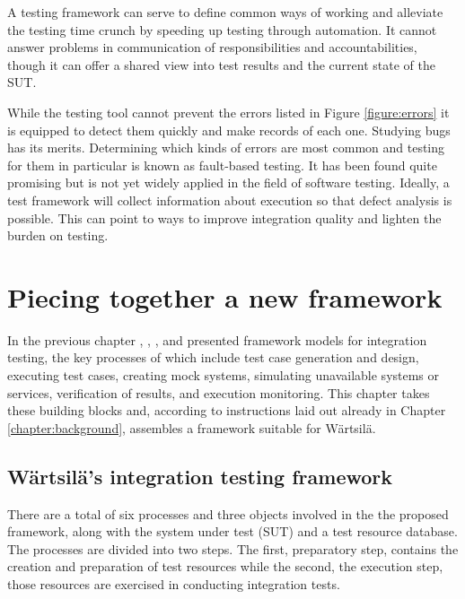 \documentclass[12pt,a4paper,oneside,pdftex]{report}
\begin{document}
{A testing framework can serve to define common ways of working and alleviate the testing time crunch by speeding up testing through automation. It cannot answer problems in communication of responsibilities and accountabilities, though it can offer a shared view into test results and the current state of the SUT.  

While the testing tool cannot prevent the errors listed in Figure \ref{figure:errors} it is equipped to detect them quickly and make records of each one. Studying bugs has its merits. Determining which kinds of errors are most common and testing for them in particular is known as fault-based testing. It has been found quite promising but is not yet widely applied in the field of software testing. \citep{pezze2008software} Ideally, a test framework will collect information about execution so that defect analysis is possible. This can point to ways to improve integration quality and lighten the burden on testing.
  
\chapter{Piecing together a new framework}
\label{chapter:frameworkproposal}

In the previous chapter \citet{fewster1999software}, \citet{huang2008surrogate}, \citet{liu2009unified}, and \citet{laukkanen2006data} presented framework models for integration testing, the key processes of which include test case generation and design, executing test cases, creating mock systems, simulating unavailable systems or services, verification of results, and execution monitoring. This chapter takes these building blocks and, according to instructions laid out already in Chapter \ref{chapter:background}, assembles a framework suitable for Wärtsilä.

\section{Wärtsilä's integration testing framework}

There are a total of six processes and three objects involved in the the proposed framework, along with the system under test (SUT) and a test resource database. The processes are divided into two steps. The first, preparatory step, contains the creation and preparation of test resources while the second, the execution step, those resources are exercised in conducting integration tests.

}
\end{document}
